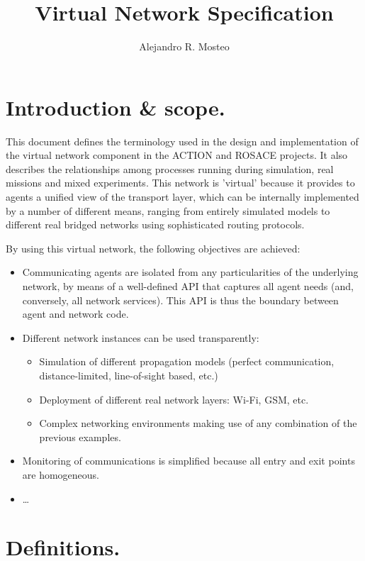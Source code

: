 \documentclass[a4paper,11pt]{article}
\newcommand{\myauthor}{Alejandro R. Mosteo}
\newcommand{\mytitle}{Virtual Network Specification}
\begin{document}
\author{\myauthor}
\title{\mytitle}
\maketitle

\section{Introduction \& scope.}

This document defines the terminology used in the design and implementation of the virtual network component in the ACTION and ROSACE projects. It also describes the relationships among processes running during simulation, real missions and mixed experiments. This network is 'virtual' because it provides to agents a unified view of the transport layer, which can be internally implemented by a number of different means, ranging from entirely simulated models to different real bridged networks using sophisticated routing protocols. 

By using this virtual network, the following objectives are achieved:

\begin{itemize}
    \item Communicating agents are isolated from any particularities of the underlying network, by means of a well-defined API that captures all agent needs (and, conversely, all network services). This API is thus the boundary between agent and network code.
    \item Different network instances can be used transparently:
        \begin{itemize}
            \item Simulation of different propagation models (perfect communication, distance-limited, line-of-sight based, etc.)
            \item Deployment of different real network layers: Wi-Fi, GSM, etc.
            \item Complex networking environments making use of any combination of the previous examples.
        \end{itemize}
    \item Monitoring of communications is simplified because all entry and exit points are homogeneous.
    \item \dots
\end{itemize}


\section{Definitions.}
\end{document}
